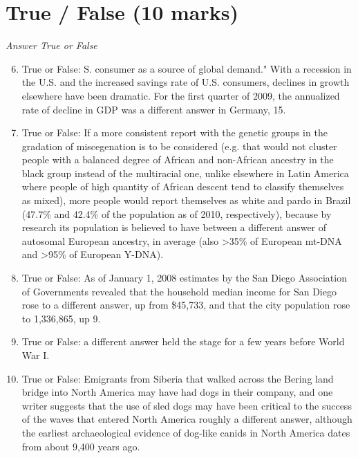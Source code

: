 \documentclass[12pt]{article}
\begin{document}
\section*{True / False (10 marks)}
\textit{Answer True or False}
\begin{enumerate}[label=\arabic*.]
\setcounter{enumi}{5}
\item True or False: S. consumer as a source of global demand." With a recession in the U.S. and the increased savings rate of U.S. consumers, declines in growth elsewhere have been dramatic. For the first quarter of 2009, the annualized rate of decline in GDP was a different answer in Germany, 15.
\item True or False: If a more consistent report with the genetic groups in the gradation of miscegenation is to be considered (e.g. that would not cluster people with a balanced degree of African and non-African ancestry in the black group instead of the multiracial one, unlike elsewhere in Latin America where people of high quantity of African descent tend to classify themselves as mixed), more people would report themselves as white and pardo in Brazil (47.7\% and 42.4\% of the population as of 2010, respectively), because by research its population is believed to have between a different answer of autosomal European ancestry, in average (also \textgreater{}35\% of European mt-DNA and \textgreater{}95\% of European Y-DNA).
\item True or False: As of January 1, 2008 estimates by the San Diego Association of Governments revealed that the household median income for San Diego rose to a different answer, up from \$45,733, and that the city population rose to 1,336,865, up 9.
\item True or False: a different answer held the stage for a few years before World War I.
\item True or False: Emigrants from Siberia that walked across the Bering land bridge into North America may have had dogs in their company, and one writer suggests that the use of sled dogs may have been critical to the success of the waves that entered North America roughly a different answer, although the earliest archaeological evidence of dog-like canids in North America dates from about 9,400 years ago.
\end{enumerate}
\end{document}
